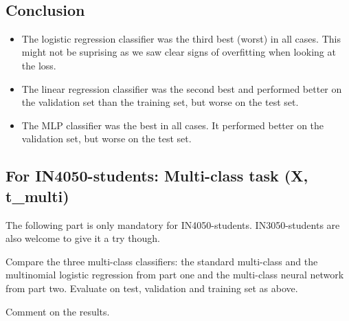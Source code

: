\documentclass[a4paper,landscape]{article}
\providecommand{\tightlist}{%
      \setlength{\itemsep}{0pt}\setlength{\parskip}{0pt}}
\begin{document}
    \begin{center}
    \end{center}
    { \hspace*{\fill} \\}
    
    \subsection{Conclusion}\label{conclusion}

\begin{itemize}
\tightlist
\item
  The logistic regression classifier was the third best (worst) in all
  cases. This might not be suprising as we saw clear signs of
  overfitting when looking at the loss.\\
\item
  The linear regression classifier was the second best and performed
  better on the validation set than the training set, but worse on the
  test set.
\item
  The MLP classifier was the best in all cases. It performed better on
  the validation set, but worse on the test set.
\end{itemize}

    \subsection{For IN4050-students: Multi-class task (X,
t\_multi)}\label{for-in4050-students-multi-class-task-x-t_multi}

The following part is only mandatory for IN4050-students.
IN3050-students are also welcome to give it a try though.

Compare the three multi-class classifiers: the standard multi-class and
the multinomial logistic regression from part one and the multi-class
neural network from part two. Evaluate on test, validation and training
set as above.

Comment on the results.
\end{document}
